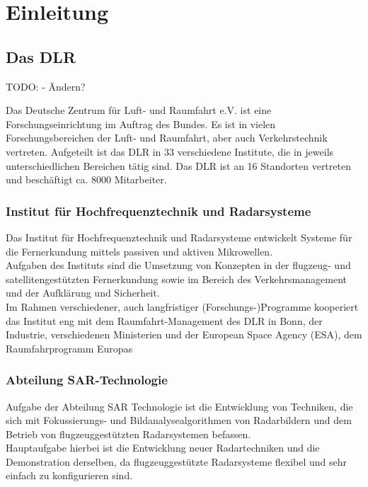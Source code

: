 \chapter{Einleitung}
\section{Das DLR}
TODO: - Ändern?

Das Deutsche Zentrum für Luft- und Raumfahrt e.V. ist eine Forschungseinrichtung im Auftrag des Bundes. Es ist in vielen Forschungsbereichen der Luft- und Raumfahrt, aber auch Verkehrstechnik vertreten. Aufgeteilt ist das DLR in 33 verschiedene Institute, die in jeweils unterschiedlichen Bereichen tätig sind. Das DLR ist an 16 Standorten vertreten und beschäftigt ca. 8000 Mitarbeiter\cite{dlr}.

\subsection{Institut für Hochfrequenztechnik und Radarsysteme}
Das Institut für Hochfrequenztechnik und Radarsysteme entwickelt Systeme für die Fernerkundung mittels passiven und aktiven Mikrowellen.\\
Aufgaben des Instituts sind die Umsetzung von Konzepten in der flugzeug- und satellitengestützten Fernerkundung sowie im Bereich des Verkehrsmanagement und der Aufklärung und Sicherheit.\\
Im Rahmen verschiedener, auch langfristiger (Forschungs-)Programme kooperiert das Institut eng mit dem Raumfahrt-Management des DLR in Bonn, der Industrie, verschiedenen Ministerien und der European Space Agency (ESA), dem Raumfahrprogramm Europas

\subsection{Abteilung SAR-Technologie}
Aufgabe der Abteilung SAR Technologie ist die Entwicklung von Techniken, die sich mit Fokussierungs- und Bildanalysealgorithmen von Radarbildern und dem Betrieb von flugzeuggestützten Radarsystemen befassen.\\
Hauptaufgabe hierbei ist die Entwicklung neuer Radartechniken und die Demonstration derselben, da flugzeuggestützte Radarsysteme flexibel und sehr einfach zu konfigurieren sind.

